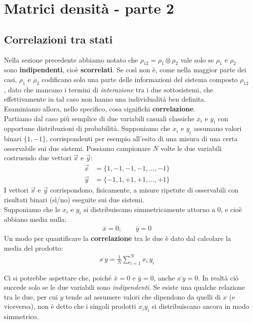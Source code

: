 \documentclass[../../InformazioneQuantistica.tex]{subfiles}
\begin{document}
\section{Matrici densità - parte 2}

\subsection{Correlazioni tra stati}
Nella sezione precedente abbiamo notato che $\rho_{12}=\rho_1 \otimes \rho_2$ vale solo se $\rho_1$ e $\rho_2$ sono \textbf{indipendenti}, cioè \textbf{scorrelati}. Se così non è, come nella maggior parte dei casi, $\rho_1$ e $\rho_2$ codificano solo una parte delle informazioni del sistema composto $\rho_{12}$, dato che mancano i termini di \textit{interazione} tra i due sottosistemi, che effettivamente in tal caso non hanno una individualità ben definita.\\

Esaminiamo allora, nello specifico, cosa significhi \textbf{correlazione}.\\
Partiamo dal caso più semplice di due variabili casuali classiche $x_i$ e $y_i$ con opportune distribuzioni di probabilità. Supponiamo che $x_i$ e $y_i$ assumano valori binari $\{1,-1\}$, corrispondenti per esempio all'esito di una misura di una certa osservabile sui due sistemi.
 Possiamo campionare $N$ volte le due variabili costruendo due vettori $\vec{x}$ e $\vec{y}$:
\begin{align*}
\vec{x} &= \{1, -1, -1,-1, \dots, -1\}\\
\vec{y} &= \{-1, 1, +1, +1, \dots, +1\}
\end{align*} 
I vettori $\vec{x}$ e $\vec{y}$ corrispondono, fisicamente, a misure ripetute di osservabili con risultati binari (sì/no) eseguite sui due sistemi.\\
Supponiamo che le $x_i$ e $y_i$ si distribuiscano simmetricamente attorno a $0$, e cioè abbiano media nulla:
\begin{align*}
\bar{x} = 0; \qquad \bar{y}=0
\end{align*}
Un modo per quantificare la \textbf{correlazione} tra le due è dato dal calcolare la media del prodotto:
\begin{align*}
\overline{x\,y} = \frac{1}{N}\sum_{i=1}^N x_i\,y_i
\end{align*}

Ci si potrebbe aspettare che, poiché $\bar{x}=0$ e $\bar{y}=0$, anche $\overline{x\,y}=0$. In realtà ciò succede solo se le due variabili sono \textit{indipendenti}. Se esiste una qualche relazione tra le due, per cui $y$ tende ad assumere valori che dipendono da quelli di $x$ (e viceversa), non è detto che i singoli prodotti $x_i y_i$ si distribuiscano ancora in modo simmetrico.\\
\end{document}
